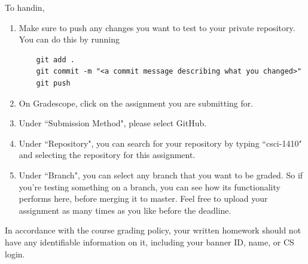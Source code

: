 \documentclass{article}
\begin{document}
To handin,
\begin{enumerate}
  \item Make sure to push any changes you want to test to your private
    repository. You can do this by running
    \begin{verbatim}
    git add .
    git commit -m "<a commit message describing what you changed>"
    git push
    \end{verbatim}

  \item On Gradescope, click on the assignment you are submitting for.

  \item Under ``Submission Method", please select GitHub.

  \item Under ``Repository", you can search for your repository by typing ``csci-1410"
    and selecting the repository for this assignment.

  \item Under ``Branch", you can select any branch that you want to be graded. So if
    you're testing something on a branch, you can see how its functionality
    performs here, before merging it to master. Feel free to upload your assignment
    as many times as you like before the deadline.
\end{enumerate}

In accordance with the course grading policy, your written homework should not have any identifiable information on it,
including your banner ID, name, or CS login.
\end{document}
